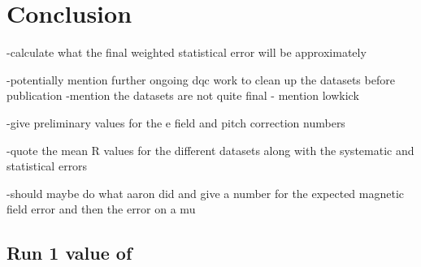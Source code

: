 
\thispagestyle{myheadings} %

\chapter{Conclusion}
\label{chapter:Conclusion}



-calculate what the final weighted statistical error will be approximately

-potentially mention further ongoing dqc work to clean up the datasets before publication
-mention the datasets are not quite final - mention lowkick

-give preliminary values for the e field and pitch correction numbers

-quote the mean R values for the different datasets along with the systematic and statistical errors

-should maybe do what aaron did and give a number for the expected magnetic field error and then the error on a mu



\section{Run 1 value of \amu}
\label{sec:FinalValue}



\cleardoublepage
